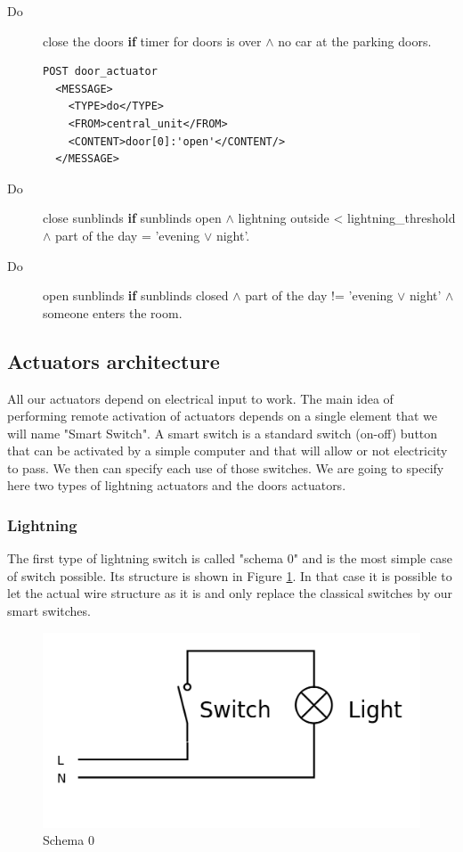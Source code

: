 \documentclass{acm_proc_article-sp}
\begin{document}
\begin{description}
 \item[Do] close the doors \textbf{if} timer for doors is over $\land$ no car at the parking doors.\\
 \begin{verbatim}
POST door_actuator
  <MESSAGE>
    <TYPE>do</TYPE>
    <FROM>central_unit</FROM>
    <CONTENT>door[0]:'open'</CONTENT/>
  </MESSAGE> 
\end{verbatim}
 \item[Do] close sunblinds \textbf{if} sunblinds open $\land$ lightning outside < lightning\_threshold $\land$ part of the day = ’evening $\lor$ night’.
 \item[Do] open sunblinds \textbf{if} sunblinds closed $\land$ part of the day != ’evening $\lor$ night’ $\land$ someone enters the room.
\end{description}
\subsection{Actuators architecture}
All our actuators depend on electrical input to work. The main idea of performing remote activation of actuators depends on a single element that we will name "Smart Switch".
A smart switch is a standard switch (on-off) button that can be activated by a simple computer and that will allow or not electricity to pass.
We then can specify each use of those switches.
We are going to specify here two types of lightning actuators and the doors actuators.
\subsubsection{Lightning}
The first type of lightning switch is called "schema 0" and is the most simple case of switch possible.
Its structure is shown in Figure \ref{schema0}.
In that case it is possible to let the actual wire structure as it is and only replace the classical switches by our smart switches.

				\begin{figure}[htb]
  				\begin{center}
    				\includegraphics[width=\linewidth]{schema0}
    				\caption{Schema 0 \label{schema0}}
  				\end{center}
				\end{figure}
\end{document}
